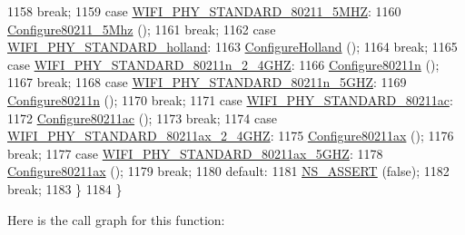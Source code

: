 \begin{DoxyCode}
1158       \textcolor{keywordflow}{break};
1159     \textcolor{keywordflow}{case} \hyperlink{group__wifi_gga1299834f4e1c615af3ca738033b76a49a8311083bdd8ae58e73ab6e81a53fd7be}{WIFI\_PHY\_STANDARD\_80211\_5MHZ}:
1160       \hyperlink{classns3_1_1WifiPhy_a7f3076e93e88d1c884dde3e390fa9756}{Configure80211\_5Mhz} ();
1161       \textcolor{keywordflow}{break};
1162     \textcolor{keywordflow}{case} \hyperlink{group__wifi_gga1299834f4e1c615af3ca738033b76a49aca926d77ddca0fc6d8cdcb190b2e520e}{WIFI\_PHY\_STANDARD\_holland}:
1163       \hyperlink{classns3_1_1WifiPhy_aba0f3d79d7fe9be1485a3d87a8923cdd}{ConfigureHolland} ();
1164       \textcolor{keywordflow}{break};
1165     \textcolor{keywordflow}{case} \hyperlink{group__wifi_gga1299834f4e1c615af3ca738033b76a49a6e449a5ca14fc7c0eb36064ce04a5192}{WIFI\_PHY\_STANDARD\_80211n\_2\_4GHZ}:
1166       \hyperlink{classns3_1_1WifiPhy_ac4cf51f397334a060632d690675446e6}{Configure80211n} ();
1167       \textcolor{keywordflow}{break};
1168     \textcolor{keywordflow}{case} \hyperlink{group__wifi_gga1299834f4e1c615af3ca738033b76a49aaabe94a0be4668583c42595437b4a6c0}{WIFI\_PHY\_STANDARD\_80211n\_5GHZ}:
1169       \hyperlink{classns3_1_1WifiPhy_ac4cf51f397334a060632d690675446e6}{Configure80211n} ();
1170       \textcolor{keywordflow}{break};
1171     \textcolor{keywordflow}{case} \hyperlink{group__wifi_gga1299834f4e1c615af3ca738033b76a49a7c078959de635b84fb280a955dcfb27e}{WIFI\_PHY\_STANDARD\_80211ac}:
1172       \hyperlink{classns3_1_1WifiPhy_a9023b105175409e6dde1281cc6584cf3}{Configure80211ac} ();
1173       \textcolor{keywordflow}{break};
1174     \textcolor{keywordflow}{case} \hyperlink{group__wifi_gga1299834f4e1c615af3ca738033b76a49a21cd71f16aa85df0b571d52f9217f330}{WIFI\_PHY\_STANDARD\_80211ax\_2\_4GHZ}:
1175       \hyperlink{classns3_1_1WifiPhy_adcda370490dc230a5c737c7a83de9bcd}{Configure80211ax} ();
1176       \textcolor{keywordflow}{break};
1177     \textcolor{keywordflow}{case} \hyperlink{group__wifi_gga1299834f4e1c615af3ca738033b76a49af5b1e598f5b0d88c961c90ad1742355f}{WIFI\_PHY\_STANDARD\_80211ax\_5GHZ}:
1178       \hyperlink{classns3_1_1WifiPhy_adcda370490dc230a5c737c7a83de9bcd}{Configure80211ax} ();
1179       \textcolor{keywordflow}{break};
1180     \textcolor{keywordflow}{default}:
1181       \hyperlink{assert_8h_a6dccdb0de9b252f60088ce281c49d052}{NS\_ASSERT} (\textcolor{keyword}{false});
1182       \textcolor{keywordflow}{break};
1183     \}
1184 \}
\end{DoxyCode}


Here is the call graph for this function\+:




